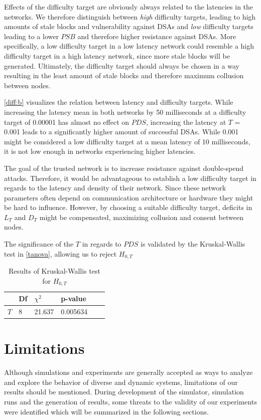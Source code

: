 \documentclass[a4paper,12pt,twoside]{report}
\begin{document}
Effects of the difficulty target are obviously always related to the latencies in the networks. We therefore distinguish between \textit{high} difficulty targets, leading to high amounts of stale blocks and vulnerability against DSAs and \textit{low} difficulty targets leading to a lower $PSB$ and therefore higher resistance against DSAs. More specifically, a low difficulty target in a low latency network could resemble a high difficulty target in a high latency network, since more stale blocks will be generated. Ultimately, the difficulty target should always be chosen in a way resulting in the least amount of stale blocks and therefore maximum collusion between nodes.

\autoref{diff:b} visualizes the relation between latency and difficulty targets. While increasing the latency mean in both networks by 50 milliseconds at a difficulty target of 0.00001 has almost no effect on $PDS$, increasing the latency at $T$ = 0.001 leads to a significantly higher amount of successful DSAs. While 0.001 might be considered a low difficulty target at a mean latency of 10 milliseconds, it is not low enough in networks experiencing higher latencies. 

The goal of the trusted network is to increase resistance against double-spend attacks. Therefore, it would be advantageous to establish a low difficulty target in regards to the latency and density of their network. Since these network parameters often depend on communication architecture or hardware they might be hard to influence. However, by choosing a suitable difficulty target, deficits in $L_{T}$ and $D_{T}$ might be compensated, maximizing collusion and consent between nodes.

The significance of the $T$ in regards to $PDS$ is validated by the Kruskal-Wallis test in \autoref{tanova}, allowing us to reject $H_{0,T}$
\begin{table}[hb]
\centering
\begin{tabular}{|l|l|l|l|l|l|} \hline
& Df & $\chi^{2}$ & p-value \\ \hline
$T$ & 8 &  21.637 & 0.005634 \\ \hline
\end{tabular}
\caption{Results of Kruskal-Wallis test for $H_{0,T}$}
\label{tanova}
\end{table}

\section{Limitations} \label{limits}
Although simulations and experiments are generally accepted as ways to analyze
and explore the behavior of diverse and dynamic systems, limitations of our results should be mentioned. During development of the simulator, simulation runs and the generation of results, some threats to the validity of our experiments were identified which will be summarized in the following sections. 
\end{document}
